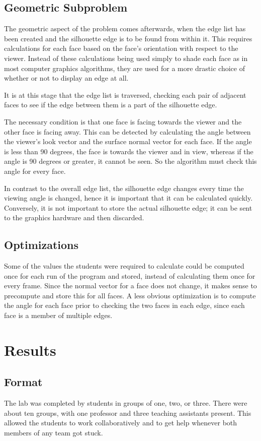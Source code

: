 \documentclass[10pt,twocolumn]{article}
\begin{document}
\subsection{Geometric Subproblem}
The geometric aspect of the problem comes afterwards, when the edge list has been created and the silhouette edge is to be found from within it.  This requires calculations for each face based on the face's orientation with respect to the viewer.  Instead of these calculations being used simply to shade each face as in most computer graphics algorithms, they are used for a more drastic choice of whether or not to display an edge at all.  

It is at this stage that the edge list is traversed, checking each pair of adjacent faces to see if the edge between them is a part of the silhouette edge.  

The necessary condition is that one face is facing towards the viewer and the other face is facing away.  This can be detected by calculating the angle between the viewer's look vector and the surface normal vector for each face.  If the angle is less than 90 degrees, the face is towards the viewer and in view, whereas if the angle is 90 degrees or greater, it cannot be seen.  So the algorithm must check this angle for every face.  

In contrast to the overall edge list, the silhouette edge changes every time the viewing angle is changed, hence it is important that it can be calculated quickly.  Conversely, it is not important to store the actual silhouette edge; it can be sent to the graphics hardware and then discarded.  

\subsection{Optimizations}
Some of the values the students were required to calculate could be computed once for each run of the program and stored, instead of calculating them once for every frame.  Since the normal vector for a face does not change, it makes sense to precompute and store this for all faces.  A less obvious optimization is to compute the angle for each face prior to checking the two faces in each edge, since each face is a member of multiple edges.  

\section{Results}
\subsection{Format}
The lab was completed by students in groups of one, two, or three.  There were about ten groups, with one professor and three teaching assistants present.  This allowed the students to work collaboratively and to get help whenever both members of any team got stuck.  
\end{document}
